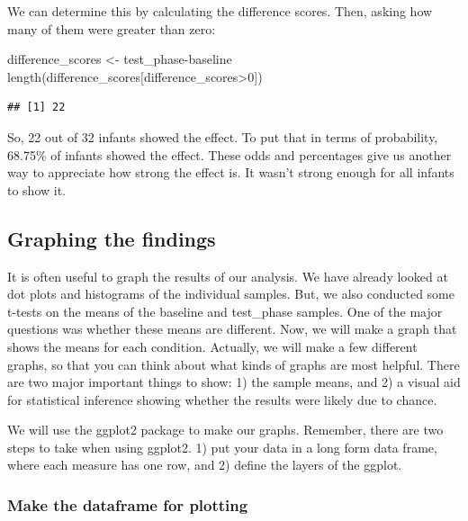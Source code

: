 \documentclass[
]{book}
\newenvironment{Shaded}{\begin{snugshade}}{\end{snugshade}}
\newcommand{\DecValTok}[1]{\textcolor[rgb]{0.00,0.00,0.81}{#1}}
\newcommand{\FunctionTok}[1]{\textcolor[rgb]{0.00,0.00,0.00}{#1}}
\newcommand{\NormalTok}[1]{#1}
\newcommand{\OtherTok}[1]{\textcolor[rgb]{0.56,0.35,0.01}{#1}}
\newcommand{\SpecialCharTok}[1]{\textcolor[rgb]{0.00,0.00,0.00}{#1}}
\begin{document}
We can determine this by calculating the difference scores. Then, asking how many of them were greater than zero:

\begin{Shaded}
\begin{Highlighting}[]
\NormalTok{difference\_scores }\OtherTok{\textless{}{-}}\NormalTok{ test\_phase}\SpecialCharTok{{-}}\NormalTok{baseline}
\FunctionTok{length}\NormalTok{(difference\_scores[difference\_scores}\SpecialCharTok{\textgreater{}}\DecValTok{0}\NormalTok{])}
\end{Highlighting}
\end{Shaded}

\begin{verbatim}
## [1] 22
\end{verbatim}

So, 22 out of 32 infants showed the effect. To put that in terms of probability, 68.75\% of infants showed the effect. These odds and percentages give us another way to appreciate how strong the effect is. It wasn't strong enough for all infants to show it.

\hypertarget{graphing-the-findings}{%
\subsection{Graphing the findings}\label{graphing-the-findings}}

It is often useful to graph the results of our analysis. We have already looked at dot plots and histograms of the individual samples. But, we also conducted some t-tests on the means of the baseline and test\_phase samples. One of the major questions was whether these means are different. Now, we will make a graph that shows the means for each condition. Actually, we will make a few different graphs, so that you can think about what kinds of graphs are most helpful. There are two major important things to show: 1) the sample means, and 2) a visual aid for statistical inference showing whether the results were likely due to chance.

We will use the ggplot2 package to make our graphs. Remember, there are two steps to take when using ggplot2. 1) put your data in a long form data frame, where each measure has one row, and 2) define the layers of the ggplot.

\hypertarget{make-the-dataframe-for-plotting}{%
\subsubsection{Make the dataframe for plotting}\label{make-the-dataframe-for-plotting}}
\end{document}
